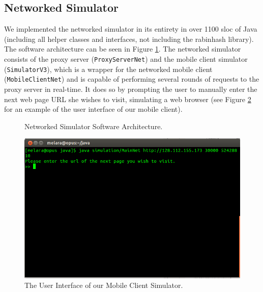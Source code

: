 \subsection{Networked Simulator}
\label{sec:netsim}
We implemented the networked simulator in its entirety in over 1100 sloc of Java (including all helper classes and interfaces, not including the rabinhash library). The software architecture can be seen in Figure \ref{fig:netsim_arch}. The networked simulator consists of the proxy server (\texttt{ProxyServerNet}) and the mobile client simulator (\texttt{SimulatorV3}), which is a wrapper for the networked mobile client (\texttt{MobileClientNet}) and is capable of performing several rounds of requests to the proxy server in real-time. It does so by prompting the user to manually enter the next web page URL she wishes to visit, simulating a web browser (see Figure \ref{fig:mobsim_ui} for an example of the user interface of our mobile client).

\begin{figure}[h] 
\caption{Networked Simulator Software Architecture.}
\label{fig:netsim_arch}
\end{figure}

\begin{figure}[h] 
\centering \includegraphics[scale=0.70]{images/mobilesim_ui.png}
\caption{The User Interface of our Mobile Client Simulator.}
\label{fig:mobsim_ui}
\end{figure}

